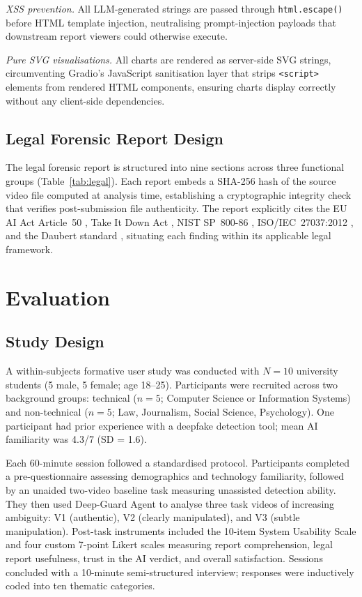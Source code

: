 \documentclass[12pt]{article}
\begin{document}
\textit{XSS prevention.}
All LLM-generated strings are passed through \texttt{html.escape()} before HTML
template injection, neutralising prompt-injection payloads that downstream report
viewers could otherwise execute.

\textit{Pure SVG visualisations.}
All charts are rendered as server-side SVG strings, circumventing Gradio's
JavaScript sanitisation layer that strips \texttt{<script>} elements from
rendered HTML components, ensuring charts display correctly without any
client-side dependencies.

\subsection{Legal Forensic Report Design}

The legal forensic report is structured into nine sections across three
functional groups (Table~\ref{tab:legal}).
Each report embeds a SHA-256 hash of the source video file computed at
analysis time, establishing a cryptographic integrity check that verifies
post-submission file authenticity.
The report explicitly cites the EU AI Act Article~50 \citep{euaiact2024},
Take It Down Act \citep{takedown2025}, NIST SP~800-86 \citep{nist80086},
ISO/IEC~27037:2012 \citep{iso27037}, and the Daubert standard \citep{daubert1993},
situating each finding within its applicable legal framework.

\section{Evaluation}

\subsection{Study Design}

A within-subjects formative user study was conducted with $N = 10$ university
students (5 male, 5 female; age 18--25).
Participants were recruited across two background groups: technical
($n = 5$; Computer Science or Information Systems) and non-technical
($n = 5$; Law, Journalism, Social Science, Psychology).
One participant had prior experience with a deepfake detection tool;
mean AI familiarity was 4.3/7 (SD = 1.6).

Each 60-minute session followed a standardised protocol.
Participants completed a pre-questionnaire assessing demographics and technology
familiarity, followed by an unaided two-video baseline task measuring unassisted
detection ability.
They then used Deep-Guard Agent to analyse three task videos of increasing
ambiguity: V1 (authentic), V2 (clearly manipulated), and V3 (subtle
manipulation).
Post-task instruments included the 10-item System Usability Scale
\citep{brooke1996} and four custom 7-point Likert scales measuring report
comprehension, legal report usefulness, trust in the AI verdict, and overall
satisfaction.
Sessions concluded with a 10-minute semi-structured interview; responses were
inductively coded into ten thematic categories.
\end{document}
